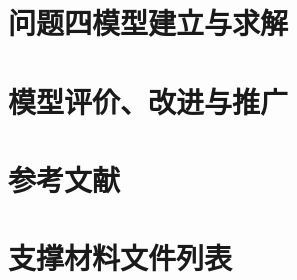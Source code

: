 \documentclass[withoutpreface,bwprint]{cumcmthesis} %
\begin{document}
\section{问题四模型建立与求解}

\section{模型评价、改进与推广}
%


\section*{参考文献}


%   



\appendix

\section{支撑材料文件列表}

\end{document}

